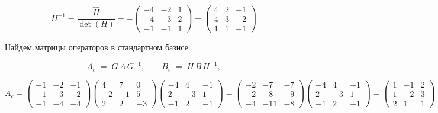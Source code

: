 \documentclass[11pt]{article}
\begin{document}
$$
H^{-1} = \frac{\hat{H}}{\det(H)} = -
\begin{pmatrix}
-4 & -2 & 1 \\
-4 & -3 & 2 \\
-1 & -1 & 1
\end{pmatrix} = 
\begin{pmatrix}
4 & 2 & -1 \\
4 & 3 & -2 \\
1 & 1 & -1
\end{pmatrix}
$$

Найдем матрицы операторов в стандартном базисе:

$$
A_e \;=\; G\,A\,G^{-1},
\qquad
B_e \;=\; H\,B\,H^{-1},
$$

$$
A_e
=\begin{pmatrix}
-1 & -2 & -1 \\
-1 & -3 & -2 \\
-1 & -4 & -4
\end{pmatrix}
\begin{pmatrix}
4 & 7 & 0 \\
-2 & -1 & 5 \\
2 & 2 & -3
\end{pmatrix}
\begin{pmatrix}
-4 & 4 & -1 \\
2 & -3 & 1 \\
-1 & 2 & -1
\end{pmatrix} =
\begin{pmatrix}
-2 & -7 & -7 \\
-2 & -8 & -9 \\
-4 & -11 & -8
\end{pmatrix}
\begin{pmatrix}
-4 & 4 & -1 \\
2 & -3 & 1 \\
-1 & 2 & -1
\end{pmatrix} =
\begin{pmatrix}
1 & -1 & 2 \\
1 & -2 & 3 \\
2 & 1 & 1
\end{pmatrix}
$$
\end{document}
